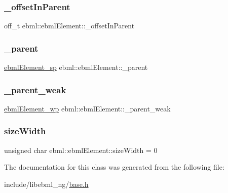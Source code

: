 \subsubsection{\texorpdfstring{\+\_\+offset\+In\+Parent}{\_offsetInParent}}
{\footnotesize\ttfamily off\+\_\+t ebml\+::ebml\+Element\+::\+\_\+offset\+In\+Parent\hspace{0.3cm}{\ttfamily [protected]}}

\mbox{\label{classebml_1_1ebmlElement_a5521124a98cbff8f29e61ecb7f265d6a}} 
\subsubsection{\texorpdfstring{\+\_\+parent}{\_parent}}
{\footnotesize\ttfamily \mbox{\hyperlink{namespaceebml_adad533b7705a16bb360fe56380c5e7be}{ebml\+Element\+\_\+sp}} ebml\+::ebml\+Element\+::\+\_\+parent}

\mbox{\label{classebml_1_1ebmlElement_ac4ae374c7897e4f8800ca6e0e1592bf9}} 
\subsubsection{\texorpdfstring{\+\_\+parent\+\_\+weak}{\_parent\_weak}}
{\footnotesize\ttfamily \mbox{\hyperlink{namespaceebml_a495fb58b42b0050d887415351af02935}{ebml\+Element\+\_\+wp}} ebml\+::ebml\+Element\+::\+\_\+parent\+\_\+weak}

\mbox{\label{classebml_1_1ebmlElement_a8f324bc8c7d54856a51592204d5012b2}} 
\subsubsection{\texorpdfstring{size\+Width}{sizeWidth}}
{\footnotesize\ttfamily unsigned char ebml\+::ebml\+Element\+::size\+Width = 0}



The documentation for this class was generated from the following file\+:\begin{DoxyCompactItemize}
\item 
include/libebml\+\_\+ng/\mbox{\hyperlink{base_8h}{base.\+h}}\end{DoxyCompactItemize}
